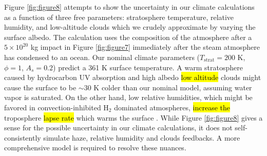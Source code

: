 Figure \ref{fig:figure8} attempts to show the uncertainty in our climate calculations as a function of three free parameters: stratosphere temperature, relative humidity, and low-altitude clouds which we crudely approximate by varying the surface albedo. The calculation uses the composition of the atmosphere after a $5 \times 10^{20}$ kg impact in Figure \ref{fig:figure7} immediately after the steam atmosphere has condensed to an ocean. Our nominal climate parameters ($T_\mathrm{strat} = 200$ K, $\phi = 1$, $A_s = 0.2$) predict a 361 K surface temperature. A warm stratosphere caused by hydrocarbon UV absorption and high albedo \hl{low altitude} clouds might cause the surface to be $\sim 30$ K colder than our nominal model, assuming water vapor is saturated. On the other hand, low relative humidities, which might be favored in convection-inhibited H$_2$ dominated atmospheres, \hl{increase the} troposphere \hl{lapse rate} which warms the surface \citep{Leconte_2017}. While Figure \ref{fig:figure8} gives a sense for the possible uncertainty in our climate calculations, it does not self-consistently simulate haze, relative humidity and clouds feedbacks. A more comprehensive model is required to resolve these nuances.

